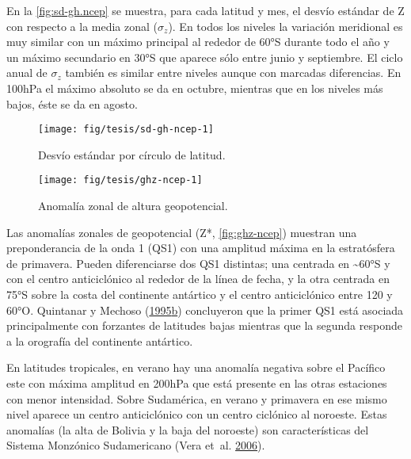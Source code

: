 \documentclass[spanish,a4paper,12p]{book}
\begin{document}
En la \autoref{fig:sd-gh.ncep} se muestra, para cada latitud y mes, el
desvío estándar de Z con respecto a la media zonal (\(\sigma_z\)). En
todos los niveles la variación meridional es muy similar con un máximo
principal al rededor de 60°S durante todo el año y un máximo secundario
en 30°S que aparece sólo entre junio y septiembre. El ciclo anual de
\(\sigma_z\) también es similar entre niveles aunque con marcadas
diferencias. En 100hPa el máximo absoluto se da en octubre, mientras que
en los niveles más bajos, éste se da en agosto.

\begin{figure}

{\centering \texttt{[image: fig/tesis/sd-gh-ncep-1]} 

}

\caption{Desvío estándar por círculo de latitud.}\label{fig:sd-gh-ncep}
\end{figure}

\begin{landscape}\begin{figure}

{\centering \texttt{[image: fig/tesis/ghz-ncep-1]} 

}

\caption{Anomalía zonal de altura geopotencial.}\label{fig:ghz-ncep}
\end{figure}
\end{landscape}

Las anomalías zonales de geopotencial (Z*, \autoref{fig:ghz-ncep})
muestran una preponderancia de la onda 1 (QS1) con una amplitud máxima
en la estratósfera de primavera. Pueden diferenciarse dos QS1 distintas;
una centrada en \textasciitilde{}60°S y con el centro anticiclónico al
rededor de la línea de fecha, y la otra centrada en 75°S sobre la costa
del continente antártico y el centro anticiclónico entre 120 y 60°O.
Quintanar y Mechoso
(\protect\hyperlink{ref-Quintanar1995}{1995}\protect\hyperlink{ref-Quintanar1995}{b})
concluyeron que la primer QS1 está asociada principalmente con forzantes
de latitudes bajas mientras que la segunda responde a la orografía del
continente antártico.

En latitudes tropicales, en verano hay una anomalía negativa sobre el
Pacífico este con máxima amplitud en 200hPa que está presente en las
otras estaciones con menor intensidad. Sobre Sudamérica, en verano y
primavera en ese mismo nivel aparece un centro anticiclónico con un
centro ciclónico al noroeste. Estas anomalías (la alta de Bolivia y la
baja del noroeste) son características del Sistema Monzónico
Sudamericano (Vera et~al. \protect\hyperlink{ref-Vera2006}{2006}).
\end{document}
